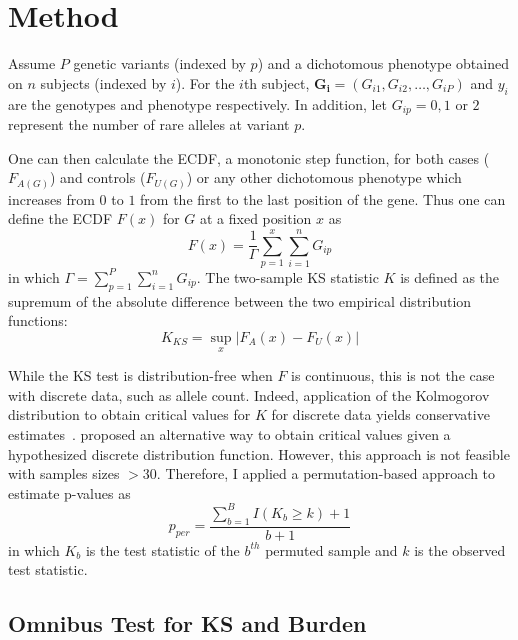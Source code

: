 \section{Method}
\label{sec:method_ksburden}

Assume $P$ genetic variants (indexed by $p$) and a dichotomous phenotype obtained on $n$ subjects (indexed by $i$).
For the $i$th subject,   $\bm{G_i} = (G_{i1}, G_{i2},\ldots , G_{iP})$ and $y_i$ are the genotypes and phenotype respectively.
In addition, let $G_{ip} = 0, 1$ or $2$ represent the number of rare alleles at variant $p$.

One can then calculate the \acrfull{ECDF}, a monotonic step function, for both cases ($F_{A(G)}$) and controls ($F_{U(G)}$) or any other dichotomous phenotype which increases from $0$ to $1$ from the first to the last position of the gene.
Thus one can define the \acrlong{ECDF} $F(x)$ for $G$ at a fixed position $x$ as
\begin{equation}
  F(x) = \frac{1}{\Gamma} \sum^x_{p=1}\sum^n_{i=1}G_{ip}
\end{equation}
in which $\Gamma = \sum^P_{p=1}\sum^n_{i=1} G_{ip}$.
The two-sample KS statistic $K$ is defined as the supremum of the absolute difference between the two empirical distribution functions:
\begin{equation}
	K_{KS} = \sup_x | F_A(x) - F_U(x) |
\end{equation}

While the KS test is distribution-free when $F$ is continuous, this is not the case with discrete data, such as allele count.
Indeed, application of the Kolmogorov distribution to obtain critical values for $K$ for discrete data yields conservative estimates~\cite{Walsh1963,Conover1972}. 
\citet{Conover1972} proposed an alternative way to obtain critical values given a hypothesized discrete distribution function.
However, this approach is not feasible with samples sizes $>30$.
Therefore, I applied a permutation-based approach to estimate p-values as 
\begin{equation}
  p_{per} = \frac{\sum^B_{b=1} I(K_b \geq k)+1}{b+1}
\end{equation}
in which $K_b$ is the test statistic of the $b^{th}$ permuted sample and $k$ is the observed test statistic.

\subsection{Omnibus Test for KS and Burden}
\label{sub:omnibus_test_for_ks_and_burden}

